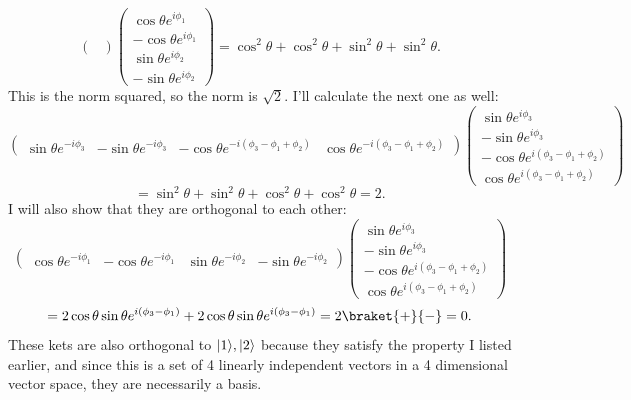 \documentclass[11pt, letterpaper]{article}
\begin{document}
\begin{enumerate}
\[\begin{pmatrix}
			\end{pmatrix}\begin{pmatrix}
			\cos \theta e^{i\phi _1}  \\
			-\cos \theta e^{i\phi _1}  \\
			\sin \theta e^{i\phi _2}  \\
			-\sin \theta e^{i\phi _2} 
			\end{pmatrix}=\cos^2\theta +\cos ^2\theta +\sin ^2\theta +\sin ^2\theta
		.\]
		This is the norm squared, so the norm is $\sqrt{2} $. I'll calculate the next one as well:
		\[
			\begin{pmatrix}
			\sin \theta e^{-i\phi _3}  & -\sin \theta e^{-i\phi _3}  & -\cos \theta e^{-i\left( \phi _3-\phi _1+\phi _2 \right) }  & \cos \theta e^{-i\left( \phi _3-\phi _1+\phi _2 \right) } 
			\end{pmatrix}\begin{pmatrix}
			\sin \theta e^{i\phi _3}  \\
			-\sin \theta e^{i\phi _3}  \\
			-\cos \theta e^{i\left( \phi _3-\phi _1+\phi _2 \right) }  \\
			\cos \theta e^{i\left( \phi _3-\phi _1+\phi _2 \right) } 
			\end{pmatrix}
		\]
		\[
			=\sin ^2\theta +\sin ^2\theta +\cos ^2\theta +\cos ^2\theta =2
		.\]
		I will also show that they are orthogonal to each other:
\[
	\begin{pmatrix}
			\cos \theta e^{-i\phi _1}  & -\cos \theta e^{-i\phi _1}  & \sin \theta e^{-i\phi _2}  & -\sin \theta e^{-i\phi _2} 
			\end{pmatrix}\begin{pmatrix}
			\sin \theta e^{i\phi _3}  \\
			-\sin \theta e^{i\phi _3}  \\
			-\cos \theta e^{i\left( \phi _3-\phi _1+\phi _2 \right) }  \\
			\cos \theta e^{i\left( \phi _3-\phi _1+\phi _2 \right) } 
			\end{pmatrix}
\]
\[
	=2\cos \theta \sin \theta e^{i(\phi _3-\phi _1)} +2 \cos \theta \sin \theta e^{i(\phi _3-\phi _1)} =2\braket{+}{-} =0
.\]
These kets are also orthogonal to $\lvert1\rangle ,\lvert2\rangle $ because they satisfy the property I listed earlier, and since this is a set of 4 linearly independent vectors in a 4 dimensional vector space, they are necessarily a basis.
\end{enumerate}
\end{document}
